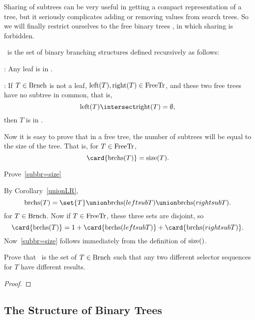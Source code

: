 Sharing of subtrees can be very useful in getting a compact
representation of a tree, but it seriously complicates adding or
removing values from search trees.  So we will finally restrict
ourselves to the free binary trees \freetr, in which sharing is
forbidden.

\begin{definition}
\freetr\ is the set of binary branching structures defined recursively
as follows:

:  Any leaf is in \freetr.

: If $T \in \text{Brnch}$ is not a leaf,
$\text{left}(T), \text{right}(T) \in \text{FreeTr}$, and these two free trees
have no subtree in common, that is,
\[
\leftsub{T} \intersect \rightsub{T} = \emptyset,
\]
then $T$ is in \freetr.
\end{definition}

Now it is easy to prove that in a free tree, the number of subtrees 
will be equal to the size of the tree.  That is, for $T \in \text{FreeTr}$,
\begin{equation}\label{subbr=size}
\card{\subbrn{T}} = \sizetr{T}.
\end{equation}

\begin{problem}

Prove~\eqref{subbr=size}
\begin{solution}
By Corollary~\ref{unionLR},
\[
\subbrn{T} = \set{T} \union \subbrn{leftsub{T}} \union \subbrn{rightsub{T}}.
\]
for $T \in \text{Brnch}$.  Now if $T \in \text{FreeTr}$, these three sets are disjoint, so
\[
\card{\subbrn{T}} = 1 + \card{\subbrn{leftsub{T}}} + \card{\subbrn{rightsub{T}}}.
\]
Now~\eqref{subbr=size} follows immediately from the definition of $\sizetr$.
\end{solution}
\end{problem}

\begin{problem}
Prove that \freetr\ is the set of $T \in \text{Brnch}$ such that any two
different selector sequences for $T$ have different results.

\begin{solution}
\begin{proof}

\end{proof}
\end{solution}
\end{problem}

\subsection{The Structure of Binary Trees}

